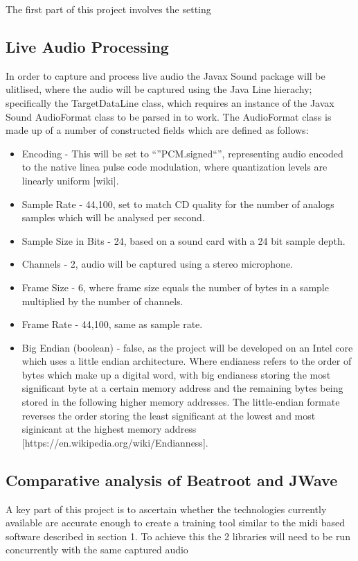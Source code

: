 \documentclass[a4paper, 11pt]{article}
\begin{document}
The first part of this project involves the setting 

\subsection{Live Audio Processing}
In order to capture and process live audio the Javax Sound package will be ulitlised, where the audio will be captured using the Java Line hierachy; specifically the TargetDataLine class, which requires an instance of the Javax Sound AudioFormat class to be parsed in to work. The AudioFormat class is made up of a number of constructed fields which are defined as follows:

\begin{itemize}
\item Encoding - This will be set to ``''PCM.signed``'', representing audio encoded to the native linea pulse code modulation, where quantization levels are linearly uniform [wiki].
\item Sample Rate - 44,100, set to match CD quality for the number of analogs samples which will be analysed per second. 
\item Sample Size in Bits - 24, based on a sound card with a 24 bit sample depth.
\item Channels - 2, audio will be captured using a stereo microphone.
\item Frame Size - 6, where frame size equals the number of bytes in a sample multiplied by the number of channels.
\item Frame Rate - 44,100, same as sample rate.
\item Big Endian (boolean) - false, as the project will be developed on an Intel core which uses a little endian architecture. Where endianess refers to the order of bytes which make up a digital word, with big endianess storing the most significant byte at a certain memory address and the remaining bytes being stored in the following higher memory addresses. The little-endian formate reverses the order storing the least significant at the lowest and most siginicant at the highest memory address [https://en.wikipedia.org/wiki/Endianness].
\end{itemize}

\subsection{Comparative analysis of Beatroot and JWave}
A key part of this project is to ascertain whether the technologies currently available are accurate enough to create a training tool similar to the midi based software described in section 1. To achieve this the 2 libraries will need to be run concurrently with the same captured audio
\end{document}
